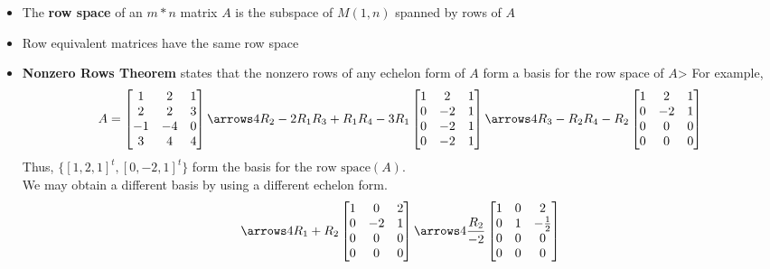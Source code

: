 \begin{itemize}
  \item The \textbf{row space} of an $m * n$ matrix $A$ is the subspace of $M(1, n)$ spanned by rows of $A$
  \item Row equivalent matrices have the same row space
  \item \textbf{Nonzero Rows Theorem} states that the nonzero rows of any echelon form of $A$ form a basis for the row space of $A$>
    For example,
    \begin{align*}
      A = \begin{bmatrix}
        1 & 2 & 1\\
        2 & 2 & 3\\
        -1 & -4 & 0\\
        3 & 4 & 4
      \end{bmatrix}
      \arrows4{}{R_2 - 2R_1}{R_3 + R_1}{R_4 - 3R_1}
      \begin{bmatrix}
        1 & 2 & 1\\
        0 & -2 & 1\\
        0 & -2 & 1\\
        0 & -2 & 1
      \end{bmatrix}
      \arrows4{}{}{R_3 - R_2}{R_4 - R_2}
      \begin{bmatrix}
        1 & 2 & 1\\
        0 & -2 & 1\\
        0 & 0 & 0\\
        0 & 0 & 0
      \end{bmatrix}
    \end{align*}
    Thus, $\{ [1, 2, 1]^t, [0, -2, 1]^t \}$ form the basis for the $\text{row space}(A)$. \\
    We may obtain a different basis by using a different echelon form.
    \begin{align*}
      \arrows4{R_1 + R_2}{}{}{}
      \begin{bmatrix}
        1 & 0 & 2\\
        0 & -2 & 1\\
        0 & 0 & 0\\
        0 & 0 & 0
      \end{bmatrix}
      \arrows4{}{\frac{R_2}{-2}}{}{}
      \begin{bmatrix}
        1 & 0 & 2\\
        0 & 1 & -\frac{1}{2}\\
        0 & 0 & 0\\
        0 & 0 & 0
      \end{bmatrix}

\end{align*}
\end{itemize}
